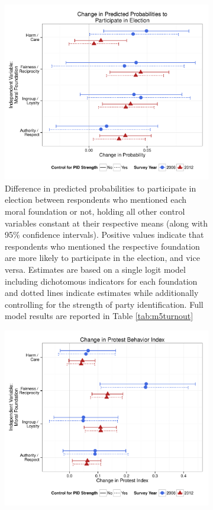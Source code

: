 \documentclass[12pt]{article}
\begin{document}
\begin{figure}[h]
  \centering
  \caption{Models predicting turnout and protest behavior based on moral reasoning including 2008 ANES data.}
  \begin{subfigure}[t]{0.49\textwidth}
    \includegraphics[scale=.4]{../calc/fig/appD9turnout.pdf}
    \caption{Difference in predicted probabilities to participate in election between respondents who mentioned each moral foundation or not, holding all other control variables constant at their respective means (along with 95\% confidence intervals). Positive values indicate that respondents who mentioned the respective foundation are more likely to participate in the election, and vice versa. Estimates are based on a single logit model including dichotomous indicators for each foundation and dotted lines indicate estimates while additionally controlling for the strength of party identification. Full model results are reported in Table \ref{tab:m5turnout}}\label{fig:appD9turnout}
  \end{subfigure}
  \begin{subfigure}[t]{0.49\textwidth}
    \includegraphics[scale=.4]{../calc/fig/appD10part.pdf}

\end{subfigure}
\end{figure}
\end{document}
